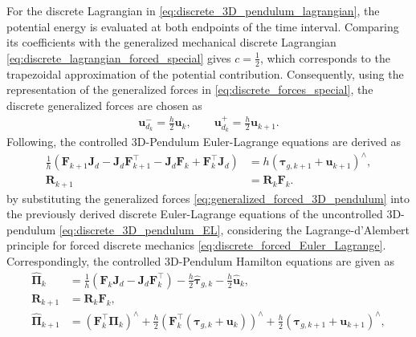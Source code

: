 For the discrete Lagrangian in
\eqref{eq:discrete_3D_pendulum_lagrangian}, the potential energy is evaluated at
both endpoints of the time interval. Comparing its coefficients with the generalized
mechanical discrete Lagrangian \eqref{eq:discrete_lagrangian_forced_special} gives $c=\frac{1}{2}$,
which corresponds to the trapezoidal approximation of the potential contribution. Consequently, using the representation
of the generalized forces in
\eqref{eq:discrete_forces_special}, the discrete 
generalized forces are chosen as
\begin{align}\label{eq:generalized_forced_3D_pendulum}
    \bm{u}_{d_k}^{-}
    =
    \frac{h}{2}\bm{u}_k,
    \qquad
    \bm{u}_{d_{k}}^{+}
    =
    \frac{h}{2}\bm{u}_{k+1}.
\end{align}
Following, the controlled 3D-Pendulum Euler-Lagrange
equations are derived as
\begin{subequations}\label{eq:forced_3D_pendulum_EL}
\begin{align}
    \label{eq:forced_3D_pendulum_EL_dynamics}
    \frac{1}{h}\left(
        \bm{F}_{k+1}\bm{J}_d
        - \bm{J}_d\bm{F}_{k+1}^{\top}
        - \bm{J}_d\bm{F}_k
        + \bm{F}_k^{\top}\bm{J}_d
    \right)
    &=
    h\left(\bm{\tau}_{g,k+1} + \bm{u}_{k+1}\right)^\wedge,
    \\
    \label{eq:forced_3D_pendulum_EL_kinematics}
    \bm{R}_{k+1} &= \bm{R}_k \bm{F}_k.
\end{align}
\end{subequations}
by substituting the generalized forces \eqref{eq:generalized_forced_3D_pendulum} into 
the previously derived discrete Euler-Lagrange equations of the uncontrolled 
3D-pendulum \eqref{eq:discrete_3D_pendulum_EL}, considering 
the Lagrange-d'Alembert principle for forced discrete mechanics \eqref{eq:discrete_forced_Euler_Lagrange}.
Correspondingly, the controlled 3D-Pendulum Hamilton equations are given as 
\begin{subequations}\label{eq:forced_3D_pendulum_hamilton}
\begin{align}
    \label{eq:forced_3D_pendulum_hamilton_1}
    \hat{\bm{\Pi}}_k
    &=
    \frac{1}{h}\left(
        \bm{F}_k \bm{J}_d
        - \bm{J}_d \bm{F}_k^{\top}
    \right)
    - \frac{h}{2}\hat{\bm{\tau}}_{g,k}
    - \frac{h}{2}\hat{\bm{u}}_k, \\
    \label{eq:forced_3D_pendulum_hamilton_2}
    \bm{R}_{k+1}
    &=
    \bm{R}_k \bm{F}_k, \\
    \label{eq:forced_3D_pendulum_hamilton_3}
    \hat{\bm{\Pi}}_{k+1}
    &=
    (\bm{F}_k^\top \bm{\Pi}_k)^\wedge
    + \frac{h}{2}\left(\bm{F}_k^\top(\bm{\tau}_{g,k} + \bm{u}_k)\right)^\wedge
    + \frac{h}{2}(\bm{\tau}_{g,k+1} + \bm{u}_{k+1})^\wedge,
\end{align}
\end{subequations}
